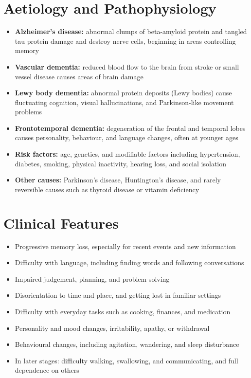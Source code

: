 \section*{Aetiology and Pathophysiology}
\begin{itemize}
    \item \textbf{Alzheimer's disease:} abnormal clumps of beta-amyloid protein and tangled tau protein damage and destroy nerve cells, beginning in areas controlling memory
    \item \textbf{Vascular dementia:} reduced blood flow to the brain from stroke or small vessel disease causes areas of brain damage
    \item \textbf{Lewy body dementia:} abnormal protein deposits (Lewy bodies) cause fluctuating cognition, visual hallucinations, and Parkinson-like movement problems
    \item \textbf{Frontotemporal dementia:} degeneration of the frontal and temporal lobes causes personality, behaviour, and language changes, often at younger ages
    \item \textbf{Risk factors:} age, genetics, and modifiable factors including hypertension, diabetes, smoking, physical inactivity, hearing loss, and social isolation
    \item \textbf{Other causes:} Parkinson's disease, Huntington's disease, and rarely reversible causes such as thyroid disease or vitamin deficiency
\end{itemize}

\section*{Clinical Features}
\begin{itemize}
    \item Progressive memory loss, especially for recent events and new information
    \item Difficulty with language, including finding words and following conversations
    \item Impaired judgement, planning, and problem-solving
    \item Disorientation to time and place, and getting lost in familiar settings
    \item Difficulty with everyday tasks such as cooking, finances, and medication
    \item Personality and mood changes, irritability, apathy, or withdrawal
    \item Behavioural changes, including agitation, wandering, and sleep disturbance
    \item In later stages: difficulty walking, swallowing, and communicating, and full dependence on others
\end{itemize}

